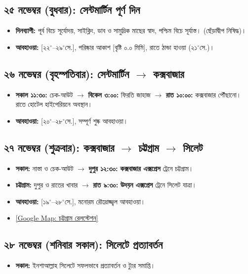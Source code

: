 \documentclass[11pt]{article}
\begin{document}
\subsection*{২৫ নভেম্বর (বুধবার): সেন্টমার্টিন পূর্ণ দিন}
\begin{itemize}
    \item \textbf{দিনব্যাপী:} পূর্ব বিচে সূর্যোদয়, সাইক্লিং, ডাব ও সামুদ্রিক মাছের স্বাদ, পশ্চিম বিচে সূর্যাস্ত। (ছেঁড়াদ্বীপ নিষিদ্ধ)।
    \item \textbf{আবহাওয়া:} [২২$^\circ$--২৯$^\circ$সে.], পরিষ্কার আকাশ [বৃষ্টি ০.০ মিমি], রাতে ঠান্ডা হাওয়া (২১$^\circ$সে.)।
\end{itemize}

\subsection*{২৬ নভেম্বর (বৃহস্পতিবার): সেন্টমার্টিন $\rightarrow$ কক্সবাজার}
\begin{itemize}
    \item \textbf{সকাল ১১:৩০:} চেক-আউট $\rightarrow$ \textbf{বিকেল ৩:০০:} ফিরতি জাহাজ $\rightarrow$ \textbf{রাত ১০:০০:} কক্সবাজার পৌঁছানো। রাতে হোটেল হাইপেরিয়নে অবস্থান।
    \item \textbf{আবহাওয়া:} [২০$^\circ$--২৮$^\circ$সে.], সম্পূর্ণ শুষ্ক আবহাওয়া।
\end{itemize}

\subsection*{২৭ নভেম্বর (শুক্রবার): কক্সবাজার $\rightarrow$ চট্টগ্রাম $\rightarrow$ সিলেট}
\begin{itemize}
    \item \textbf{সকাল:} নাস্তা ও চেক-আউট $\rightarrow$ \textbf{দুপুর ১২:৩০:} \textbf{কক্সবাজার এক্সপ্রেস} ট্রেনে চট্টগ্রাম।
    \item \textbf{চট্টগ্রাম:} দুপুর ও রাতের খাবার $\rightarrow$ \textbf{রাত ৯:৩০:} \textbf{উদয়ন এক্সপ্রেস} ট্রেনে সিলেট যাত্রা।
    \item \textbf{আবহাওয়া:} [১৯$^\circ$--২৮$^\circ$সে.], মনোরম রৌদ্রোজ্জ্বল আবহাওয়া।
    \item \href{https://maps.google.com/?q=Chattogram+Railway+Station}{\color{primary}[Google Map: চট্টগ্রাম রেলস্টেশন]}
\end{itemize}

\subsection*{২৮ নভেম্বর (শনিবার সকাল): সিলেটে প্রত্যাবর্তন}
\begin{itemize}
    \item \textbf{সকাল:} ইনশাআল্লাহ সিলেটে সফলভাবে প্রত্যাবর্তন ও ট্যুর সমাপ্তি।
\end{itemize}
\end{document}
